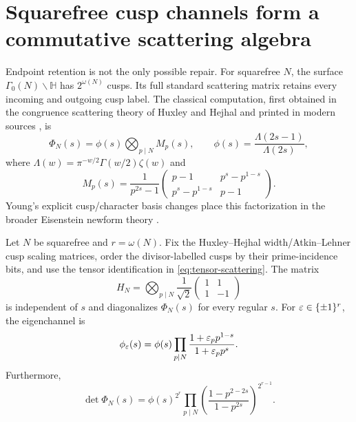 \section{Squarefree cusp channels form a commutative scattering algebra}

Endpoint retention is not the only possible repair.  For squarefree
\(N\), the surface \(\Gamma_0(N)\backslash\mathbb H\) has
\(2^{\omega(N)}\) cusps.  Its full standard scattering matrix retains every
incoming and outgoing cusp label.  The classical computation, first obtained
in the congruence scattering theory of Huxley and Hejhal and printed in modern
sources \cite{Huxley1984,CakoniChanillo2019,LevitinStrohmaier2021}, is
\begin{equation}
\Phi_N(s)=\phi(s)\bigotimes_{p\mid N}M_p(s),
\qquad
\phi(s)=\frac{\Lambda(2s-1)}{\Lambda(2s)},
\label{eq:tensor-scattering}
\end{equation}
where \(\Lambda(w)=\pi^{-w/2}\Gamma(w/2)\zeta(w)\) and
\begin{equation}
M_p(s)=\frac1{p^{2s}-1}
\begin{pmatrix}
p-1&p^s-p^{1-s}\\
p^s-p^{1-s}&p-1
\end{pmatrix}.
\label{eq:local-block}
\end{equation}
Young's explicit cusp/character basis changes place this factorization in the
broader Eisenstein newform theory \cite{Young2019}.

\begin{theorem}
Let \(N\) be squarefree and \(r=\omega(N)\).  Fix the Huxley--Hejhal
width/Atkin--Lehner cusp scaling matrices, order the divisor-labelled cusps by
their prime-incidence bits, and use the tensor identification in
\cref{eq:tensor-scattering}.  The matrix
\[
H_N=\bigotimes_{p\mid N}\frac1{\sqrt2}
\begin{pmatrix}1&1\\1&-1\end{pmatrix}
\]
is independent of \(s\) and diagonalizes \(\Phi_N(s)\) for every regular
\(s\).  For \(\varepsilon\in\{\pm1\}^r\), the eigenchannel is
\begin{equation}
\phi_\varepsilon(s)=\phi(s)
\prod_{p\mid N}
\frac{1+\varepsilon_p p^{1-s}}{1+\varepsilon_p p^s}.
\label{eq:eigenchannel}
\end{equation}
Furthermore,
\begin{equation}
\det\Phi_N(s)=\phi(s)^{2^r}
\prod_{p\mid N}
\left(\frac{1-p^{2-2s}}{1-p^{2s}}\right)^{2^{r-1}}.
\label{eq:scattering-determinant}
\end{equation}
\end{theorem}

